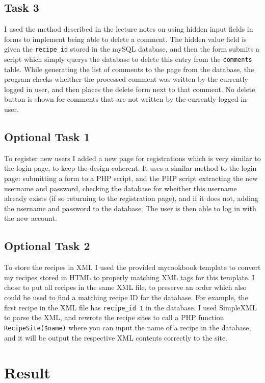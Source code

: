 \documentclass[a4paper]{scrreprt}
\newcommand{\code}[1]{\texttt{#1}}
\begin{document}
\section{Task 3}

I used the method described in the lecture notes on using hidden input fields in forms to implement being able to delete a comment. The hidden value field is given the \code{recipe\_id} stored in the mySQL database, and then the form submits a script which simply querys the database to delete this entry from the \code{comments} table. While generating the list of comments to the page from the database, the program checks wheither the processed comment was written by the currently logged in user, and then places the delete form next to that comment. No delete button is shown for comments that are not written by the currently logged in user.

\section{Optional Task 1}

To register new users I added a new page for registrations which is very similar to the login page, to keep the design coherent. It uses a similar method to the login page: submitting a form to a PHP script, and the PHP script extracting the new username and password, checking the database for wheither this username already exists (if so returning to the registration page), and if it does not, adding the username and password to the database. The user is then able to log in with the new account.

\section{Optional Task 2}

To store the recipes in XML I used the provided mycookbook template to convert my recipes stored in HTML to properly matching XML tags for this template. I chose to put all recipes in the same XML file, to preserve an order which also could be used to find a matching recipe ID for the database. For example, the first recipe in the XML file has \code{recipe\_id 1} in the database. I used SimpleXML to parse the XML, and rewrote the recipe sites to call a PHP function \code{RecipeSite(\$name)} where you can input the name of a recipe in the database, and it will be output the respective XML contents correctly to the site.


\chapter{Result}
\label{sec:result}
\end{document}
